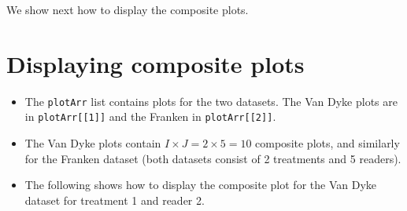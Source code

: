 \documentclass[
]{book}
\newenvironment{Shaded}{\begin{snugshade}}{\end{snugshade}}
\newcommand{\AttributeTok}[1]{\textcolor[rgb]{0.77,0.63,0.00}{#1}}
\newcommand{\ConstantTok}[1]{\textcolor[rgb]{0.00,0.00,0.00}{#1}}
\newcommand{\ControlFlowTok}[1]{\textcolor[rgb]{0.13,0.29,0.53}{\textbf{#1}}}
\newcommand{\DecValTok}[1]{\textcolor[rgb]{0.00,0.00,0.81}{#1}}
\newcommand{\FunctionTok}[1]{\textcolor[rgb]{0.00,0.00,0.00}{#1}}
\newcommand{\NormalTok}[1]{#1}
\newcommand{\OtherTok}[1]{\textcolor[rgb]{0.56,0.35,0.01}{#1}}
\newcommand{\SpecialCharTok}[1]{\textcolor[rgb]{0.00,0.00,0.00}{#1}}
\providecommand{\tightlist}{%
  \setlength{\itemsep}{0pt}\setlength{\parskip}{0pt}}
\begin{document}
\begin{Shaded}
\end{Shaded}

We show next how to display the composite plots.

\hypertarget{rsm-3-fits-composite-plots}{%
\section{Displaying composite plots}\label{rsm-3-fits-composite-plots}}

\begin{itemize}
\tightlist
\item
  The \texttt{plotArr} list contains plots for the two datasets. The Van Dyke plots are in \texttt{plotArr{[}{[}1{]}{]}} and the Franken in \texttt{plotArr{[}{[}2{]}{]}}.
\item
  The Van Dyke plots contain \(I \times J = 2 \times 5 = 10\) composite plots, and similarly for the Franken dataset (both datasets consist of 2 treatments and 5 readers).
\item
  The following shows how to display the composite plot for the Van Dyke dataset for treatment 1 and reader 2.
\end{itemize}
\end{document}
